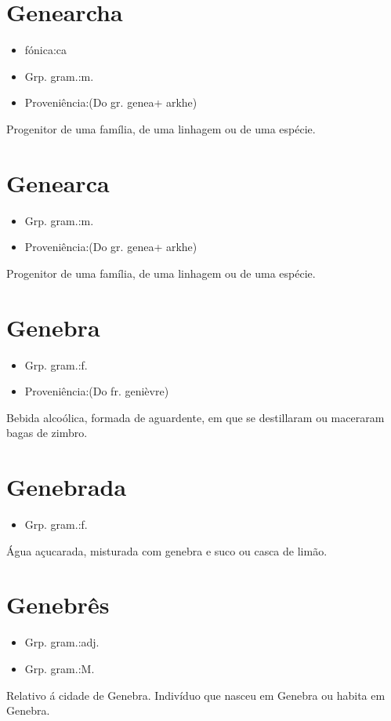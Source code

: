 \section{Genearcha}
\begin{itemize}
\item {fónica:ca}
\end{itemize}
\begin{itemize}
\item {Grp. gram.:m.}
\end{itemize}
\begin{itemize}
\item {Proveniência:(Do gr. \textunderscore genea\textunderscore  + \textunderscore arkhe\textunderscore )}
\end{itemize}
Progenitor de uma família, de uma linhagem ou de uma espécie.
\section{Genearca}
\begin{itemize}
\item {Grp. gram.:m.}
\end{itemize}
\begin{itemize}
\item {Proveniência:(Do gr. \textunderscore genea\textunderscore  + \textunderscore arkhe\textunderscore )}
\end{itemize}
Progenitor de uma família, de uma linhagem ou de uma espécie.
\section{Genebra}
\begin{itemize}
\item {Grp. gram.:f.}
\end{itemize}
\begin{itemize}
\item {Proveniência:(Do fr. \textunderscore genièvre\textunderscore )}
\end{itemize}
Bebida alcoólica, formada de aguardente, em que se destillaram ou maceraram bagas de zimbro.
\section{Genebrada}
\begin{itemize}
\item {Grp. gram.:f.}
\end{itemize}
Água açucarada, misturada com genebra e suco ou casca de limão.
\section{Genebrês}
\begin{itemize}
\item {Grp. gram.:adj.}
\end{itemize}
\begin{itemize}
\item {Grp. gram.:M.}
\end{itemize}
Relativo á cidade de Genebra.
Indivíduo que nasceu em Genebra ou habita em Genebra.
